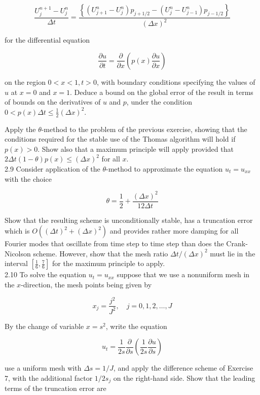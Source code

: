 \documentclass[10pt]{article}
\begin{document}
\[
\frac{U_{j}^{n+1}-U_{j}^{n}}{\Delta t}=\frac{\left\{\left(U_{j+1}^{n}-U_{j}^{n}\right) p_{j+1 / 2}-\left(U_{j}^{n}-U_{j-1}^{n}\right) p_{j-1 / 2}\right\}}{(\Delta x)^{2}}
\]

for the differential equation

\[
\frac{\partial u}{\partial t}=\frac{\partial}{\partial x}\left(p(x) \frac{\partial u}{\partial x}\right)
\]

on the region \(0<x<1, t>0\), with boundary conditions specifying the values of \(u\) at \(x=0\) and \(x=1\). Deduce a bound on the global error of the result in terms of bounds on the derivatives of \(u\) and \(p\), under the condition \(0<p(x) \Delta t \leq \frac{1}{2}(\Delta x)^{2}\).

Apply the \(\theta\)-method to the problem of the previous exercise, showing that the conditions required for the stable use of the Thomas algorithm will hold if \(p(x)>0\). Show also that a maximum principle will apply provided that \(2 \Delta t(1-\theta) p(x) \leq(\Delta x)^{2}\) for all \(x\).\\
2.9 Consider application of the \(\theta\)-method to approximate the equation \(u_{t}=u_{x x}\) with the choice

\[
\theta=\frac{1}{2}+\frac{(\Delta x)^{2}}{12 \Delta t}
\]

Show that the resulting scheme is unconditionally stable, has a truncation error which is \(O\left((\Delta t)^{2}+(\Delta x)^{2}\right)\) and provides rather more damping for all Fourier modes that oscillate from time step to time step than does the Crank-Nicolson scheme. However, show that the mesh ratio \(\Delta t /(\Delta x)^{2}\) must lie in the interval \(\left[\frac{1}{6}, \frac{7}{6}\right]\) for the maximum principle to apply.\\
2.10 To solve the equation \(u_{t}=u_{x x}\) suppose that we use a nonuniform mesh in the \(x\)-direction, the mesh points being given by

\[
x_{j}=\frac{j^{2}}{J^{2}}, \quad j=0,1,2, \ldots, J
\]

By the change of variable \(x=s^{2}\), write the equation

\[
u_{t}=\frac{1}{2 s} \frac{\partial}{\partial s}\left(\frac{1}{2 s} \frac{\partial u}{\partial s}\right)
\]

use a uniform mesh with \(\Delta s=1 / J\), and apply the difference scheme of Exercise 7, with the additional factor \(1 / 2 s_{j}\) on the right-hand side. Show that the leading terms of the truncation error are
\end{document}
